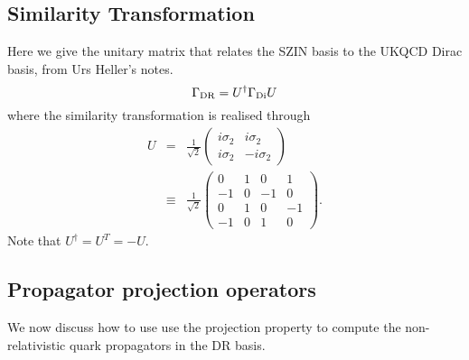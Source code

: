 \documentclass[12pt]{article}
\newcommand{\ch}{{\rm DR}}
\newcommand{\dirac}{{\rm Di}}
\begin{document}
\subsection{Similarity Transformation}
Here we give the unitary matrix that relates the SZIN basis to the
UKQCD Dirac basis, from Urs Heller's notes.
\[
\Gamma_\ch = U^{\dagger} \Gamma_\dirac U
\]
where the similarity transformation is realised through
\begin{eqnarray}
U & = &\frac{1}{\sqrt{2}} \left(
\begin{array}{rr}
i \sigma_2 & i \sigma_2\\
i \sigma_2 & -i \sigma_2
\end{array}
\right)\nonumber \\
& \equiv & \frac{1}{\sqrt{2}}
\left(
\begin{array}{rrrr}
 0 & 1 & 0 & 1\\
 -1 & 0 & -1 & 0\\
 0 & 1 & 0 & -1\\
-1 & 0 & 1 & 0
\end{array}
\right).\label{eq:sim_def}
\end{eqnarray}
Note that $U^{\dagger} = U^T = -U$.

\subsection{Propagator projection operators}
We now discuss how to use use the projection property to compute the
non-relativistic quark propagators in the DR basis.
\end{document}
